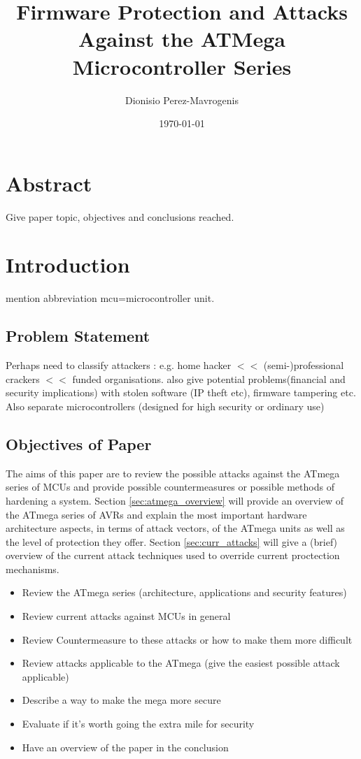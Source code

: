 \documentclass[12pt,a4paper,twocolumn]{article}
\author{Dionisio Perez-Mavrogenis}
\title{Firmware Protection and Attacks Against the ATMega Microcontroller Series}
\date{\today}
\begin{document}
	\maketitle
	
\section*{Abstract}
	Give paper topic, objectives and conclusions reached.
	

\section{Introduction}
	mention abbreviation mcu=microcontroller unit. 
	\subsection{Problem Statement}
	Perhaps need to classify attackers : e.g. home hacker $<<$ (semi-)professional crackers $<<$ funded organisations. also give potential problems(financial and security implications) with stolen software (IP theft etc), firmware tampering etc. Also separate microcontrollers (designed for high security or ordinary use)

	\subsection{Objectives of Paper}
	The aims of this paper are to review the possible attacks against the ATmega series of MCUs and provide possible countermeasures or possible methods of hardening a system. Section \ref{sec:atmega_overview} will provide an overview of the ATmega series of AVRs and explain the most important hardware architecture aspects, in terms of attack vectors, of the ATmega units as well as the level of protection they offer. Section \ref{sec:curr_attacks} will give a (brief) overview of the current attack techniques used to override current proctection mechanisms. 
	\begin{itemize}
	\item Review the ATmega series (architecture, applications and security features)\\
	\item Review current attacks against MCUs in general \\
	\item Review Countermeasure to these attacks or how to make them more difficult
	\item Review attacks applicable to the ATmega (give the easiest possible attack applicable)
	\item Describe a way to make the mega more secure
	\item Evaluate if it's worth going the extra mile for security
	\item Have an overview of the paper in the conclusion
	\end{itemize}
	
\end{document}
